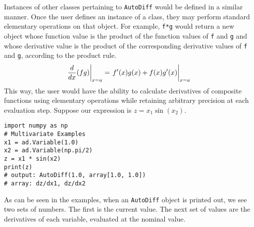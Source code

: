 Instances of other classes pertaining to \texttt{AutoDiff} would be 
defined in a similar manner. Once the user defines an instance of a class, they
may perform standard elementary operations on that object. For example,
\texttt{f*g} would return a new object whose function value is the product of the
function values of \texttt{f} and \texttt{g} and whose derivative value is the
product of the corresponding derivative values of \texttt{f} and \texttt{g},
according to the product rule. 
\begin{equation}
    \left.\frac{d}{dx}(fg)\right|_{x=a} 
    = 
    \left.\vphantom{\frac{d}{dx}}f'(x)g(x) + f(x)g'(x)\right|_{x=a}
\end{equation}
This way, the user would have the ability to calculate derivatives of 
composite functions using elementary operations while retaining arbitrary 
precision at each evaluation step. Suppose our expression is $z = x_1 \sin(x_2)$.
\begin{verbatim} 
import numpy as np
# Multivariate Examples
x1 = ad.Variable(1.0)
x2 = ad.Variable(np.pi/2)
z = x1 * sin(x2)
print(z)
# output: AutoDiff(1.0, array[1.0, 1.0])
# array: dz/dx1, dz/dx2
\end{verbatim}
As can be seen in the examples, when an \texttt{AutoDiff} object is printed out,
we see two sets of numbers. The first is the current value. The next set of values
are the derivatives of each variable, evaluated at the nominal value.